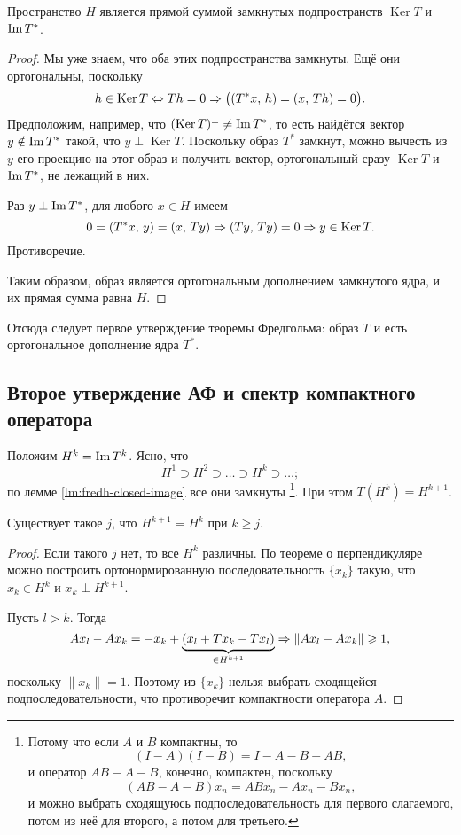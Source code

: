 \documentclass{notes}
\DeclareMathOperator{\Ker}{Ker}
\begin{document}
	\begin{lm} \label{lm:fredh-direct-sum}
		Пространство $H$ является прямой суммой замкнутых подпространств $\Ker T$ и $\operatorname{Im} T^*$.
		\begin{proof}
			Мы уже знаем, что оба этих подпространства замкнуты. Ещё они ортогональны, поскольку
			\[
				h \in \Ker T \eqv Th = 0 \so \big((T^*x, \, h) = (x, \, T h) = 0\big). 
			\]
			Предположим, например, что $(\Ker T)^{\perp} \neq \im T^*$, то есть найдётся вектор $y \notin \operatorname{Im} T^*$ такой, что $y \perp \Ker T$. Поскольку образ $T^*$ замкнут, можно вычесть из $y$ его проекцию на этот образ и получить вектор, ортогональный сразу $\Ker T$ и $\operatorname{Im} T^*$, не лежащий в них.

			Раз $y \perp \operatorname{Im} T^*$, для любого $x \in H$ имеем
			\[	
				0 = (T^*x, \, y) = (x, \, Ty) \so (Ty, \, Ty) = 0 \so y \in \Ker T.
			\]
			Противоречие.

			Таким образом, образ является ортогональным дополнением замкнутого ядра, и их прямая сумма равна $H$.
		\end{proof}
	\end{lm}

	Отсюда следует первое утверждение теоремы Фредгольма: образ $T$ и есть ортогональное дополнение ядра $T^*$.

\subsection{Второе утверждение АФ и спектр компактного оператора}

	Положим $H^k = \operatorname{Im} T^k$. Ясно, что
	\[
		H^1 \supset H^2 \supset \ldots \supset H^k \supset \ldots;
	\]
	по лемме \ref{lm:fredh-closed-image} все они замкнуты \footnote{Потому что если $A$ и $B$ компактны, то
	\[
		(I - A)(I - B) = I - A - B + AB,
	\]
	и оператор $AB - A - B$, конечно, компактен, поскольку
	\[
		(AB - A - B)x_n = ABx_n - Ax_n - Bx_n,
	\]
	и можно выбрать сходящуюсь подпоследовательность для первого слагаемого, потом из неё для второго, а потом для третьего.
	}. При этом $T(H^k) = H^{k + 1}$.

	\begin{lm}
		Существует такое $j$, что $H^{k + 1} = H^k$ при $k \geqslant j$.
		\begin{proof}
			Если такого $j$ нет, то все $H^k$ различны. По теореме о перпендикуляре можно построить ортонормированную последовательность $\{x_k\}$ такую, что $x_k \in H^k$ и $x_k \perp H^{k + 1}$. 

			Пусть $l > k$. Тогда
			\[
				Ax_l - Ax_k = -x_k + \underbrace{(x_l + Tx_k - Tx_l)}_{\in H^{k + 1}} \Rightarrow \|Ax_l - Ax_k\| \geqslant 1,
			\]
			поскольку $\|x_k\| = 1$. Поэтому из $\{x_k\}$ нельзя выбрать сходящейся подпоследовательности, что противоречит компактности оператора $A$.
		\end{proof} 
	\end{lm} 
\end{document}
